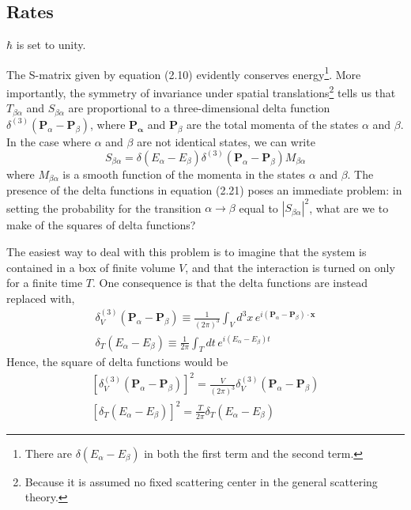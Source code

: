 \documentclass[12pt]{article}
\numberwithin{equation}{section}
\begin{document}
\subsection{Rates}
$\hbar$ is set to unity.

The S-matrix given by equation (2.10) evidently conserves energy\footnote{There are $\delta(E_{\alpha}-E_{\beta})$ in both the first term and the second term.}.
More importantly, the symmetry of invariance under spatial translations\footnote{Because it is assumed no fixed scattering center in the general scattering theory.} tells us that $T_{\beta\alpha}$ and $S_{\beta\alpha}$ are proportional to a three-dimensional delta function $\delta^{(3)}(\mathbf{P}_{\alpha}-\mathbf{P}_{\beta})$, where $\mathbf{P_{\alpha}}$ and $\mathbf{P}_{\beta}$ are the total momenta of the states $\alpha$ and $\beta$.
In the case where $\alpha$ and $\beta$ are not identical states, we can write 
\begin{equation}
    S_{\beta\alpha} = \delta(E_{\alpha}-E_{\beta})\delta^{(3)}(\mathbf{P}_{\alpha}-\mathbf{P}_{\beta})M_{\beta\alpha}
\end{equation}
where $M_{\beta\alpha}$ is a smooth function of the momenta in the states $\alpha$ and $\beta$.
The presence of the delta functions in equation (2.21) poses an immediate problem: 
in setting the probability for the transition $\alpha\rightarrow\beta$ equal to $|S_{\beta\alpha}|^2$, what are we to make of the squares of delta functions?

The easiest way to deal with this problem is to imagine that the system is contained in a box of finite volume $V$, and that the interaction is turned on only for a finite time $T$.
One consequence is that the delta functions are instead replaced with,
\begin{equation}
    \begin{split}
        \delta^{(3)}_{V}(\mathbf{P}_{\alpha}-\mathbf{P}_{\beta}) \equiv \frac{1}{(2\pi)^3}\int_{V}{d^3x\,e^{i(\mathbf{P}_{\alpha}-\mathbf{P}_{\beta})\cdot\mathbf{x}}}\\
        \delta_{T}(E_{\alpha}-E_{\beta}) \equiv \frac{1}{2\pi}\int_{T}{dt\,e^{i(E_{\alpha}-E_{\beta})t}}
    \end{split}
\end{equation}
Hence, the square of delta functions would be
\begin{equation}
    \begin{split}
        \left[\delta_{V}^{(3)}(\mathbf{P}_{\alpha}-\mathbf{P}_{\beta})\right]^2 = \frac{V}{(2\pi)^3}\delta^{(3)}_{V}(\mathbf{P}_{\alpha}-\mathbf{P}_{\beta})\\
        \left[\delta_{T}(E_{\alpha}-E_{\beta})\right]^2 = \frac{T}{2\pi}\delta_{T}(E_{\alpha}-E_{\beta})
    \end{split}
\end{equation}
\end{document}
